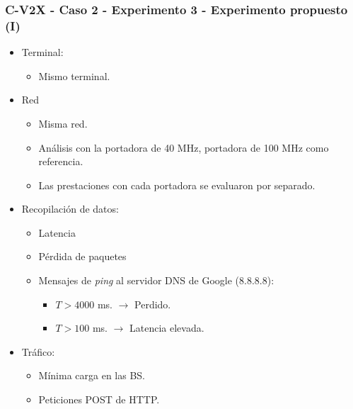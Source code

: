 \documentclass{beamer}
\begin{document}
%
%

\begin{frame}
\frametitle{C-V2X - Caso 2 - Experimento 3 - Experimento propuesto (I)}

\begin{itemize}
\item {
	Terminal:
	\begin{itemize}
	\item Mismo terminal.
	\end{itemize}
}
\item {
	Red
	\begin{itemize}
	\item Misma red.
	\item Análisis con la portadora de 40 MHz, portadora de 100 MHz como referencia.
	\item Las prestaciones con cada portadora se evaluaron por separado.
	\end{itemize}
}
\item {
	Recopilación de datos:
	\begin{itemize}
	\item Latencia
	\item Pérdida de paquetes
	\item {
		Mensajes de \textit{ping} al servidor DNS de Google (8.8.8.8):
		\begin{itemize}
		\item $T > 4000$ ms. $\rightarrow$ Perdido.
		\item $T > 100$ ms. $\rightarrow$ Latencia elevada.
		\end{itemize}
	}
	\end{itemize}
}
\item {
	Tráfico:
	\begin{itemize}
	\item Mínima carga en las BS.
	\item Peticiones POST de HTTP.
	\end{itemize}
}
\end{itemize}
\end{frame}
\end{document}

